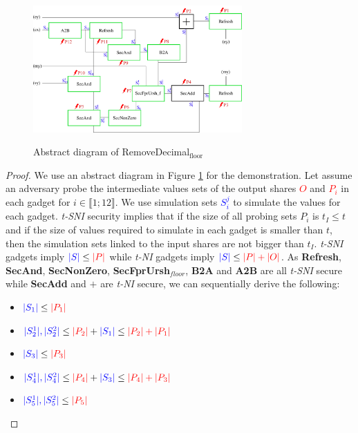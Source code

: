 \documentclass[runningheads]{llncs}
\begin{document}
\begin{figure}[ht]
  \centering
  \includegraphics[width=8cm]{figure/RemoveDec2.pdf}
  \label{fig:RemoveDec}
  \caption{Abstract diagram of RemoveDecimal$_\text{floor}$}
\end{figure}
\begin{proof}
  We use an abstract diagram in Figure \ref{fig:RemoveDec} for the demonstration. Let assume an adversary probe the intermediate values sets of the output shares \textcolor{red}{$O$} and \textcolor{red}{$P_i$} in each gadget for $i\in\llbracket 1;12 \rrbracket$. We use simulation sets \textcolor{blue}{$S_i^j$} to simulate the values for each gadget. \emph{t-SNI} security implies that if the size of all probing sets $P_i$ is $t_I\leq t$ and if the size of values required to simulate in each gadget is smaller than $t$, then the simulation sets linked to the input shares are not bigger than $t_I$. \emph{t-SNI} gadgets imply $\textcolor{blue}{|S|} \leq \textcolor{red}{|P|}$ while \emph{t-NI} gadgets imply $\textcolor{blue}{|S|} \leq \textcolor{red}{|P|+|O|}$. As \textbf{Refresh}, \textbf{SecAnd}, \textbf{SecNonZero}, \textbf{SecFprUrsh$_{floor}$}, \textbf{B2A} and \textbf{A2B} are all \emph{t-SNI} secure while \textbf{SecAdd} and \textbf{$+$} are \emph{t-NI} secure, we can sequentially derive the following:
  \begin{multicols}{2}
    \begin{itemize}
      \item $\textcolor{blue}{|S_1|} \leq \textcolor{red}{|P_1|}$
      \item $\textcolor{blue}{|S_2^1|,|S_2^2|} \leq \textcolor{red}{|P_2|} + \textcolor{blue}{|S_1|} \leq \textcolor{red}{|P_2|+|P_1|}$
      \item $\textcolor{blue}{|S_3|} \leq \textcolor{red}{|P_3|}$
      \item $\textcolor{blue}{|S_4^1|,|S_4^2|} \leq \textcolor{red}{|P_4|} + \textcolor{blue}{|S_3|} \leq \textcolor{red}{|P_4|+|P_3|}$
      \item $\textcolor{blue}{|S_5^1|,|S_5^2|} \leq \textcolor{red}{|P_5|}$

\end{itemize}
\end{multicols}
\end{proof}
\end{document}
